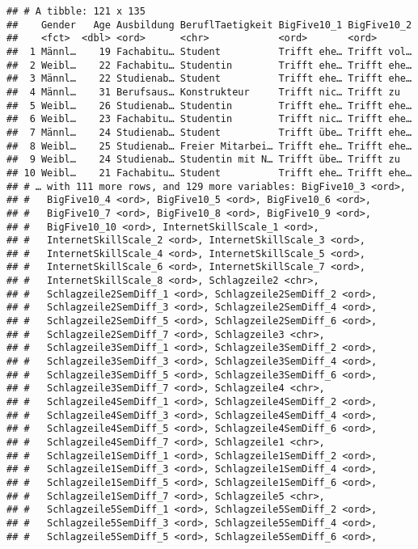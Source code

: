 \documentclass[]{article}
\begin{document}
\begin{verbatim}
## # A tibble: 121 x 135
##    Gender   Age Ausbildung BeruflTaetigkeit BigFive10_1 BigFive10_2
##    <fct>  <dbl> <ord>      <chr>            <ord>       <ord>      
##  1 Männl…    19 Fachabitu… Student          Trifft ehe… Trifft vol…
##  2 Weibl…    22 Fachabitu… Studentin        Trifft ehe… Trifft ehe…
##  3 Männl…    22 Studienab… Student          Trifft ehe… Trifft ehe…
##  4 Männl…    31 Berufsaus… Konstrukteur     Trifft nic… Trifft zu  
##  5 Weibl…    26 Studienab… Studentin        Trifft ehe… Trifft ehe…
##  6 Weibl…    23 Fachabitu… Studentin        Trifft nic… Trifft ehe…
##  7 Männl…    24 Studienab… Student          Trifft übe… Trifft ehe…
##  8 Weibl…    25 Studienab… Freier Mitarbei… Trifft ehe… Trifft ehe…
##  9 Weibl…    24 Studienab… Studentin mit N… Trifft übe… Trifft zu  
## 10 Weibl…    21 Fachabitu… Student          Trifft ehe… Trifft ehe…
## # … with 111 more rows, and 129 more variables: BigFive10_3 <ord>,
## #   BigFive10_4 <ord>, BigFive10_5 <ord>, BigFive10_6 <ord>,
## #   BigFive10_7 <ord>, BigFive10_8 <ord>, BigFive10_9 <ord>,
## #   BigFive10_10 <ord>, InternetSkillScale_1 <ord>,
## #   InternetSkillScale_2 <ord>, InternetSkillScale_3 <ord>,
## #   InternetSkillScale_4 <ord>, InternetSkillScale_5 <ord>,
## #   InternetSkillScale_6 <ord>, InternetSkillScale_7 <ord>,
## #   InternetSkillScale_8 <ord>, Schlagzeile2 <chr>,
## #   Schlagzeile2SemDiff_1 <ord>, Schlagzeile2SemDiff_2 <ord>,
## #   Schlagzeile2SemDiff_3 <ord>, Schlagzeile2SemDiff_4 <ord>,
## #   Schlagzeile2SemDiff_5 <ord>, Schlagzeile2SemDiff_6 <ord>,
## #   Schlagzeile2SemDiff_7 <ord>, Schlagzeile3 <chr>,
## #   Schlagzeile3SemDiff_1 <ord>, Schlagzeile3SemDiff_2 <ord>,
## #   Schlagzeile3SemDiff_3 <ord>, Schlagzeile3SemDiff_4 <ord>,
## #   Schlagzeile3SemDiff_5 <ord>, Schlagzeile3SemDiff_6 <ord>,
## #   Schlagzeile3SemDiff_7 <ord>, Schlagzeile4 <chr>,
## #   Schlagzeile4SemDiff_1 <ord>, Schlagzeile4SemDiff_2 <ord>,
## #   Schlagzeile4SemDiff_3 <ord>, Schlagzeile4SemDiff_4 <ord>,
## #   Schlagzeile4SemDiff_5 <ord>, Schlagzeile4SemDiff_6 <ord>,
## #   Schlagzeile4SemDiff_7 <ord>, Schlagzeile1 <chr>,
## #   Schlagzeile1SemDiff_1 <ord>, Schlagzeile1SemDiff_2 <ord>,
## #   Schlagzeile1SemDiff_3 <ord>, Schlagzeile1SemDiff_4 <ord>,
## #   Schlagzeile1SemDiff_5 <ord>, Schlagzeile1SemDiff_6 <ord>,
## #   Schlagzeile1SemDiff_7 <ord>, Schlagzeile5 <chr>,
## #   Schlagzeile5SemDiff_1 <ord>, Schlagzeile5SemDiff_2 <ord>,
## #   Schlagzeile5SemDiff_3 <ord>, Schlagzeile5SemDiff_4 <ord>,
## #   Schlagzeile5SemDiff_5 <ord>, Schlagzeile5SemDiff_6 <ord>,

\end{verbatim}
\end{document}
